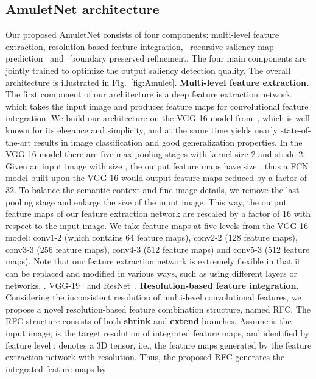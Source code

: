 \documentclass[10pt,twocolumn,letterpaper]{article}
\begin{document}
\subsection{AmuletNet architecture}
Our proposed AmuletNet consists of four components: multi-level feature extraction, resolution-based feature integration,~ recursive saliency map prediction~ and~ boundary preserved refinement.
The four main components are jointly trained to optimize the output saliency detection quality.
The overall architecture is illustrated in Fig.~\ref{fig:Amulet}.
{\flushleft\textbf{Multi-level feature extraction.}}
The first component of our architecture is a deep feature extraction network, which takes the input image and produces feature maps for convolutional feature integration.
We build our architecture on the VGG-16 model from~\cite{simonyan2014very}, which is well known for its elegance and simplicity, and at the same time yields nearly state-of-the-art results in image classification and good generalization properties. In the VGG-16 model there are five max-pooling stages with kernel size 2 and stride 2.
Given an input image with size , the output feature maps have size , thus a FCN model built upon the VGG-16 would output feature maps reduced by a factor of 32.
To balance the semantic context and fine image details, we remove the last pooling stage and enlarge the size of the input image.
This way, the output feature maps of our feature extraction network are rescaled by a factor of 16 with respect to the input image.
We take feature maps at five levels from the VGG-16 model: conv1-2 (which contains 64 feature maps), conv2-2 (128 feature maps), conv3-3 (256 feature maps), conv4-3 (512 feature maps) and conv5-3 (512 feature maps).
Note that our feature extraction network is extremely flexible in that it can be replaced and modified in various ways, such as using different layers or networks, \eg. VGG-19~\cite{simonyan2014very} and ResNet~\cite{He2016Deep}.\vspace{-2mm}
{\flushleft \textbf{Resolution-based feature integration.}}
Considering the inconsistent resolution of multi-level convolutional features, we propose a novel resolution-based feature combination structure, named RFC.
The RFC structure consists of both \textbf{shrink} and \textbf{extend} branches.
Assume  is the input image;  is the target resolution of integrated feature maps, and identified by feature level ;  denotes a 3D tensor, i.e., the feature maps generated by the feature extraction network with  resolution.
Thus, the proposed RFC generates the integrated feature maps by
\end{document}

